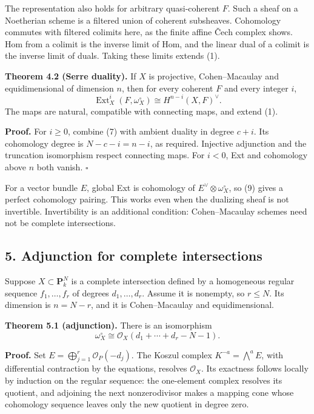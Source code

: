 \documentclass[11pt]{article}
\begin{document}
The representation also holds for arbitrary quasi-coherent \(F\). Such a
sheaf on a Noetherian scheme is a filtered union of coherent subsheaves.
Cohomology commutes with filtered colimits here, as the finite affine
Čech complex shows. Hom from a colimit is the inverse limit of Hom, and
the linear dual of a colimit is the inverse limit of duals. Taking these
limits extends (1).

\textbf{Theorem 4.2 (Serre duality).} If \(X\) is projective,
Cohen--Macaulay and equidimensional of dimension \(n\), then for every
coherent \(F\) and every integer \(i\), \[
\operatorname{Ext}^i_X(F,\omega_X^\circ)
 \cong H^{n-i}(X,F)^\vee.
\tag{9}
\] The maps are natural, compatible with connecting maps, and extend
(1).

\textbf{Proof.} For \(i\geq0\), combine (7) with ambient duality in
degree \(c+i\). Its cohomology degree is \(N-c-i=n-i\), as required.
Injective adjunction and the truncation isomorphism respect connecting
maps. For \(i<0\), Ext and cohomology above \(n\) both vanish.
\(\square\)

For a vector bundle \(E\), global Ext is cohomology of
\(E^\vee\otimes\omega_X^\circ\), so (9) gives a perfect cohomology
pairing. This works even when the dualizing sheaf is not invertible.
Invertibility is an additional condition: Cohen--Macaulay schemes need
not be complete intersections.

\subsection{5. Adjunction for complete
intersections}\label{adjunction-for-complete-intersections}

Suppose \(X\subset\mathbf P^N_k\) is a complete intersection defined by
a homogeneous regular sequence \(f_1,\ldots,f_r\) of degrees
\(d_1,\ldots,d_r\). Assume it is nonempty, so \(r\leq N\). Its dimension
is \(n=N-r\), and it is Cohen--Macaulay and equidimensional.

\textbf{Theorem 5.1 (adjunction).} There is an isomorphism \[
\omega_X^\circ\cong
 \mathcal O_X(d_1+\cdots+d_r-N-1).
\tag{10}
\]

\textbf{Proof.} Set \(E=\bigoplus_{j=1}^r\mathcal O_P(-d_j)\). The
Koszul complex \(K^{-a}=\bigwedge^aE\), with differential contraction by
the equations, resolves \(\mathcal O_X\). Its exactness follows locally
by induction on the regular sequence: the one-element complex resolves
its quotient, and adjoining the next nonzerodivisor makes a mapping cone
whose cohomology sequence leaves only the new quotient in degree zero.
\end{document}
